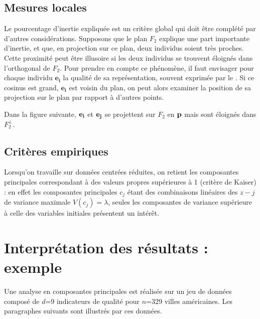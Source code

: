\documentclass[letterpaper,10pt,french]{sphinxmanual}
\begin{document}
\sphinxAtStartPar
{}


\subsection{Mesures locales}
\label{\detokenize{acp:mesures-locales}}
\sphinxAtStartPar
Le pourcentage d’inertie expliquée est un critère global qui doit être complété par d’autres considérations. Supposons que le plan \(F_2\) explique une part importante d’inertie, et que, en projection sur ce plan, deux individus soient très proches. Cette proximité peut être illusoire si les deux individus se trouvent éloignés dans l’orthogonal de \(F_2\). Pour prendre en compte ce phénomène, il faut envisager pour chaque individu \(\mathbf{e_i}\) la qualité de sa représentation, souvent exprimée par le . Si ce cosinus est grand, \(\mathbf{e_i}\) est voisin du plan, on peut  alors examiner la position de sa projection sur le plan par rapport à d’autres points.

\sphinxAtStartPar
Dans la figure suivante, \({\bf e_i} \) et \({\bf e_j}\) se projettent sur \(F_2\) en \({\bf p}\) mais sont éloignés dans \(F_2^\perp\).

\sphinxAtStartPar
{}


\subsection{Critères empiriques}
\label{\detokenize{acp:criteres-empiriques}}
\ignorespaces 
\sphinxAtStartPar
Lorsqu’on travaille sur données centrées réduites, on retient les composantes principales correspondant à des valeurs propres supérieures à 1 (critère de Kaiser) : en effet les composantes principales \(c_j\) étant des combinaisons linéaires des \(z-j\) de variance maximale \(V(c_j)=\lambda\), seules les composantes de variance supérieure à celle des variables initiales présentent un intérêt.


\section{Interprétation des résultats : exemple}
\label{\detokenize{acp:interpretation-des-resultats-exemple}}
\sphinxAtStartPar
Une analyse en composantes principales est réalisée sur un jeu de données composé de \(d\)=9 indicateurs de qualité pour \(n\)=329 villes américaines. Les paragraphes suivants sont illustrés par ces données.
\end{document}
